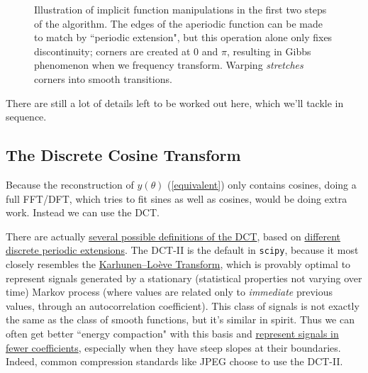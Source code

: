\documentclass[10pt]{article}
\begin{document}
\begin{figure}[h!]
\begin{center}
\end{center}
\captionsetup{width=0.85\textwidth}
\caption*{Illustration of implicit function manipulations in the first two steps of the algorithm. The edges of the aperiodic function can be made to match by ``periodic extension", but this operation alone only fixes discontinuity; corners are created at 0 and $\pi$, resulting in Gibbs phenomenon when we frequency transform. Warping \textit{stretches} corners into smooth transitions.}
\end{figure}

There are still a lot of details left to be worked out here, which we'll tackle in sequence.

\subsection{The Discrete Cosine Transform}\label{fftdct}

Because the reconstruction of $y(\theta)$ (\autoref{equivalent}) only contains cosines, doing a full FFT/DFT, which tries to fit sines as well as cosines, would be doing extra work. Instead we can use the DCT.

There are actually \href{https://docs.scipy.org/doc/scipy/reference/generated/scipy.fft.dct.html}{several possible definitions of the DCT}\cite{dct}, based on \href{https://en.wikipedia.org/wiki/Discrete_cosine_transform#Informal_overview}{different discrete periodic extensions}. The DCT-II is the default in \texttt{scipy}\cite{dct}, because it most closely resembles the \href{https://www.farbrausch.de/%7Efg/articles/dct_klt.pdf}{Karhunen–Loève Transform}\cite{klt}, which is provably optimal to represent signals generated by a stationary (statistical properties not varying over time) Markov process (where values are related only to \textit{immediate} previous values, through an autocorrelation coefficient). This class of signals is not exactly the same as the class of smooth functions, but it's similar in spirit. Thus we can often get better ``energy compaction" with this basis and \href{https://dsp.stackexchange.com/a/96197/40873}{represent signals in fewer coefficients}\cite{energycompaction}, especially when they have steep slopes at their boundaries. Indeed, common compression standards like JPEG choose to use the DCT-II.
\end{document}
